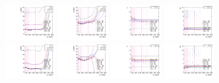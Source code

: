 \begin{figure}[htbp]
  \includegraphics[width=0.2\textwidth]{fig/2Dfit/paramSignalShape_allSig_MJJ_HP_nobb_LDy_mean.pdf}
  \includegraphics[width=0.2\textwidth]{fig/2Dfit/paramSignalShape_allSig_MJJ_HP_nobb_LDy_sigma.pdf}
  \includegraphics[width=0.2\textwidth]{fig/2Dfit/paramSignalShape_allSig_MJJ_HP_nobb_LDy_alpha.pdf}
  \includegraphics[width=0.2\textwidth]{fig/2Dfit/paramSignalShape_allSig_MJJ_HP_nobb_LDy_alpha2.pdf}\\
  \includegraphics[width=0.2\textwidth]{fig/2Dfit/paramSignalShape_allSig_MJJ_LP_nobb_LDy_mean.pdf}
  \includegraphics[width=0.2\textwidth]{fig/2Dfit/paramSignalShape_allSig_MJJ_LP_nobb_LDy_sigma.pdf}
  \includegraphics[width=0.2\textwidth]{fig/2Dfit/paramSignalShape_allSig_MJJ_LP_nobb_LDy_alpha.pdf}
  \includegraphics[width=0.2\textwidth]{fig/2Dfit/paramSignalShape_allSig_MJJ_LP_nobb_LDy_alpha2.pdf}\\

\end{figure}
